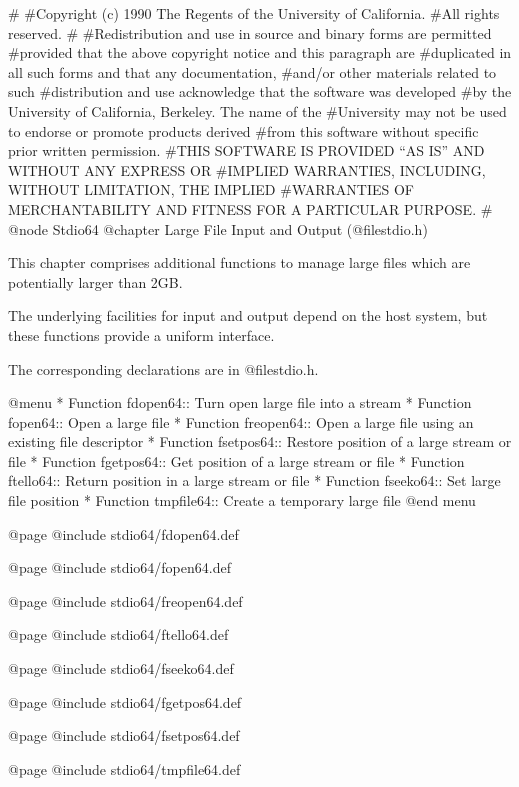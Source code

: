 #
#Copyright (c) 1990 The Regents of the University of California.
#All rights reserved.
#
#Redistribution and use in source and binary forms are permitted
#provided that the above copyright notice and this paragraph are
#duplicated in all such forms and that any documentation,
#and/or other materials related to such
#distribution and use acknowledge that the software was developed
#by the University of California, Berkeley.  The name of the
#University may not be used to endorse or promote products derived
#from this software without specific prior written permission.
#THIS SOFTWARE IS PROVIDED ``AS IS'' AND WITHOUT ANY EXPRESS OR
#IMPLIED WARRANTIES, INCLUDING, WITHOUT LIMITATION, THE IMPLIED
#WARRANTIES OF MERCHANTABILITY AND FITNESS FOR A PARTICULAR PURPOSE.
#
@node Stdio64
@chapter Large File Input and Output (@file{stdio.h}) 

This chapter comprises additional functions to manage large files which
are potentially larger than 2GB.

The underlying facilities for input and output depend on the host
system, but these functions provide a uniform interface.

The corresponding declarations are in @file{stdio.h}.

@menu
* Function fdopen64::    Turn open large file into a stream
* Function fopen64::     Open a large file
* Function freopen64::   Open a large file using an existing file descriptor
* Function fsetpos64::   Restore position of a large stream or file
* Function fgetpos64::   Get position of a large stream or file
* Function ftello64::    Return position in a large stream or file
* Function fseeko64::    Set large file position
* Function tmpfile64::   Create a temporary large file
@end menu 

@page
@include stdio64/fdopen64.def

@page
@include stdio64/fopen64.def

@page
@include stdio64/freopen64.def

@page 
@include stdio64/ftello64.def 

@page
@include stdio64/fseeko64.def

@page
@include stdio64/fgetpos64.def

@page
@include stdio64/fsetpos64.def

@page
@include stdio64/tmpfile64.def

